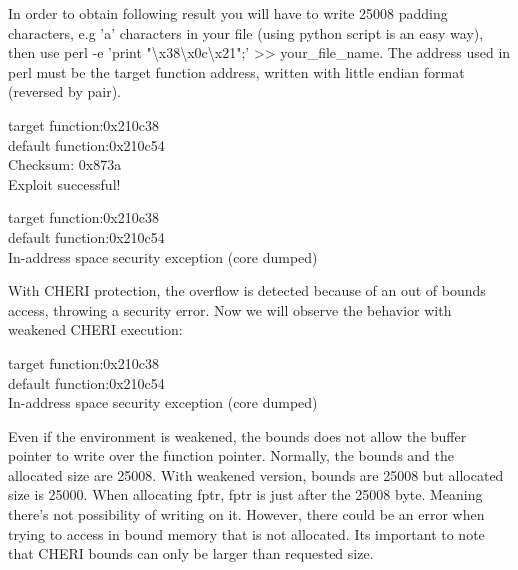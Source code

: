 \documentclass[a4paper, 11pt]{article}
\begin{document}
	In order to obtain following result you will have to write 25008 padding characters, e.g 'a' characters in your file (using python script is an easy way), then use perl -e 'print "\textbackslash x38\textbackslash x0c\textbackslash x21";' >> your\_file\_name.
	The address used in perl must be the target function address, written with little endian format (reversed by pair).
	\begin{tcolorbox}[colback=gray!5!white, colframe=gray!75!black, title=baseline RISC-V environment ]
		target function:0x210c38\\
		default function:0x210c54\\
		Checksum: 0x873a\\
		Exploit successful!
	\end{tcolorbox}
	\begin{tcolorbox}[colback=gray!5!white, colframe=blue!75!black, title=CHERI-RISC-V environment]
		target function:0x210c38\\
		default function:0x210c54\\
		In-address space security exception (core dumped)
	\end{tcolorbox}
	With CHERI protection, the overflow is detected because of an out of bounds access, throwing a security error.
	Now we will observe the behavior with weakened CHERI execution:
	\begin{tcolorbox}[colback=gray!5!white, colframe=lightblue!75!black, title=weakened CHERI-RISC-V environment]
		target function:0x210c38\\
		default function:0x210c54\\
		In-address space security exception (core dumped)
	\end{tcolorbox}
	Even if the environment is weakened, the bounds does not allow the buffer pointer to write over the function pointer.
	Normally, the bounds and the allocated size are 25008. With weakened version, bounds are 25008 but allocated size is 25000. When allocating fptr, fptr is just after the 25008 byte. Meaning there's not possibility of writing on it. However, there could be an error when trying to access in bound memory that is not allocated.	
	Its important to note that CHERI bounds can only be larger than requested size.
\end{document}
